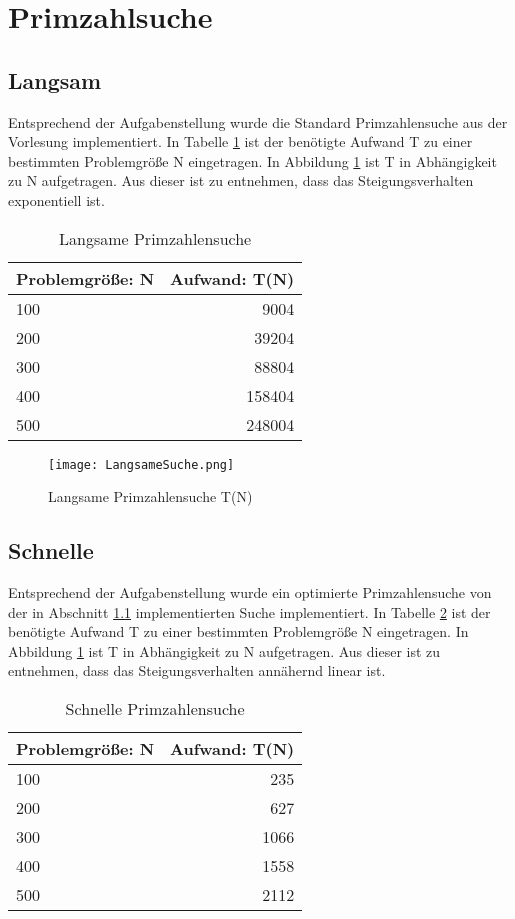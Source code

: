 \section{Primzahlsuche}
\label{sec:Primzahlensuche}
\subsection{Langsam}
\label{subsec:langsameSuche}
Entsprechend der Aufgabenstellung wurde die Standard Primzahlensuche aus der Vorlesung implementiert.
In Tabelle \ref{tab: langsame Suche} ist der benötigte Aufwand T zu einer bestimmten Problemgröße N eingetragen.
In Abbildung \ref{fig:langsameSuche} ist T in Abhängigkeit zu N aufgetragen. Aus dieser ist zu entnehmen, dass das Steigungsverhalten exponentiell ist.
\begin{table}[htbp]
\caption{Langsame Primzahlensuche}
\label{tab: langsame Suche}
\centering
\begin{tabular}{l|r}
Problemgröße: N	&	Aufwand: T(N)	\\
\hline
100				&	9004			\\
200				&	39204			\\
300				&	88804			\\
400				&	158404			\\
500				&	248004			\\
\end{tabular}
\end{table}

\begin{figure}[htbp]
\centering
\texttt{[image: LangsameSuche.png]}
\caption{Langsame Primzahlensuche T(N)}
\label{fig:langsameSuche}
\end{figure}

\subsection{Schnelle}
\label{subsec:schnelleSuche}
Entsprechend der Aufgabenstellung wurde ein optimierte Primzahlensuche von der in Abschnitt \ref{subsec:langsameSuche} implementierten Suche implementiert.
In Tabelle \ref{tab:schnelleSuche} ist der benötigte Aufwand T zu einer bestimmten Problemgröße N eingetragen.
In Abbildung \ref{fig:langsameSuche} ist T in Abhängigkeit zu N aufgetragen. Aus dieser ist zu entnehmen, dass das Steigungsverhalten annähernd linear ist.
\begin{table}[htbp]
\caption{Schnelle Primzahlensuche}
\label{tab:schnelleSuche}
\centering
\begin{tabular}{l|r}
Problemgröße: N	&	Aufwand: T(N)	\\
\hline
100				&	235			\\
200				&	627			\\
300				&	1066		\\
400				&	1558		\\
500				&	2112		\\
\end{tabular}
\end{table}


